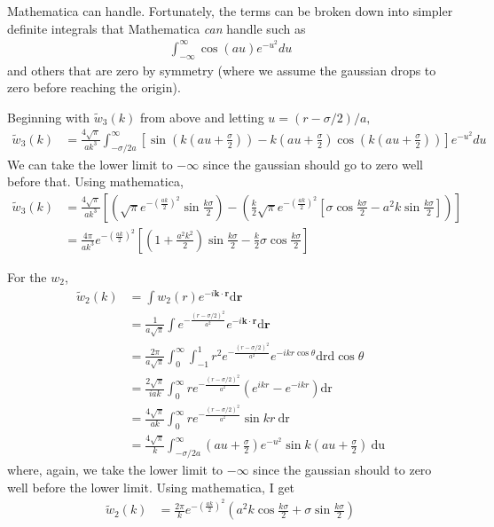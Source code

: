 \documentclass[letterpaper,twocolumn,amsmath,amssymb,prb]{revtex4-1}
\newcommand{\rr}{\textbf{r}}
\begin{document}
Mathematica can handle.  Fortunately, the terms can be broken down
into simpler definite integrals that Mathematica \emph{can} handle
such as
\begin{align}
  \int_{-\infty}^\infty \cos(a u)e^{-u^2}du
\end{align}
and others that are zero by symmetry (where we assume the gaussian
drops to zero before reaching the origin).
\begin{widetext}
Beginning with $\tilde{w}_3(k)$ from above and letting $u = (r-\sigma/2)/a,$
  \begin{align}
    \tilde{w}_3(k)
    &=  \frac{4\sqrt{\pi}}{ak^3}\int_{-\sigma/2a}^\infty \left[ \sin(k(au+\frac{\sigma}{2}))
      - k(au + \frac{\sigma}{2}) \cos(k(au+\frac{\sigma}{2}))\right] e^{-u^2} du
  \end{align}
We can take the lower limit to $-\infty$ since the gaussian should go
to zero well before that. Using mathematica,
  \begin{align}
    \tilde{w}_3(k) &= \frac{4\sqrt{\pi}}{ak^3}
    \left[ \left(\sqrt{\pi}e^{-\left(\frac{ak}{2}\right)^2}
    \sin{\frac{k\sigma}{2}} \right) - \left( \frac{k}{2}
    \sqrt{\pi}e^{-\left(\frac{ak}{2}\right)^2} \left[\sigma
      \cos{\frac{k \sigma}{2}} - a^2 k \sin{\frac{k \sigma}{2}}
      \right] \right)\right] \\ &=
    \frac{4\pi}{ak^3}e^{-\left(\frac{ak}{2}\right)^2}\left[ \left(1 + \frac{a^2k^2}{2} \right)
      \sin{\frac{k\sigma}{2}} - \frac{k}{2} \sigma\cos{\frac{k \sigma}{2}}  \right]
  \end{align}
\end{widetext}

For the $w_2$,
\begin{align}
  \tilde{w}_2(k) &= \int w_2(r) e^{-i \mathbf{k} \cdot
    \rr} \textrm{d} \rr \\
  &= \frac{1}{a\sqrt{\pi}}\int e^{-\frac{(r-\sigma/2)^2}{a^2}} e^{-i \mathbf{k} \cdot
    \rr} \textrm{d} \rr \\
  &= \frac{2\pi}{a\sqrt{\pi}}\int_0^\infty \int_{-1}^1 r^2 e^{-\frac{(r-\sigma/2)^2}{a^2}}
  e^{-ikr\cos{\theta}} \textrm{drd}\cos{\theta} \\
  &= \frac{2\sqrt{\pi}}{iak} \int_0^\infty r e^{-\frac{(r-\sigma/2)^2}{a^2}}
  \left(e^{ikr} - e^{-ikr}\right) \textrm{dr} \\
  &= \frac{4\sqrt{\pi}}{ak} \int_0^\infty r e^{-\frac{(r-\sigma/2)^2}{a^2}}
  \sin{kr} ~\textrm{dr} \\
  &= \frac{4\sqrt{\pi}}{k} \int_{-\sigma/2a}^\infty \left(au +
  \frac{\sigma}{2}\right) e^{-u^2} \sin{k\left(au +
  \frac{\sigma}{2}\right)} ~\textrm{du}
\end{align}
where, again, we take the lower limit to $-\infty$ since the gaussian
should to zero well before the lower limit. Using mathematica, I get
\begin{align}
  \tilde{w}_2(k) &=\frac{2\pi}{k} e^{-\left(\frac{ak}{2} \right)^2} \left(a^2 k
  \cos{\frac{k\sigma}{2}} +\sigma \sin{\frac{k\sigma}{2}} \right)
\end{align}
\end{document}
